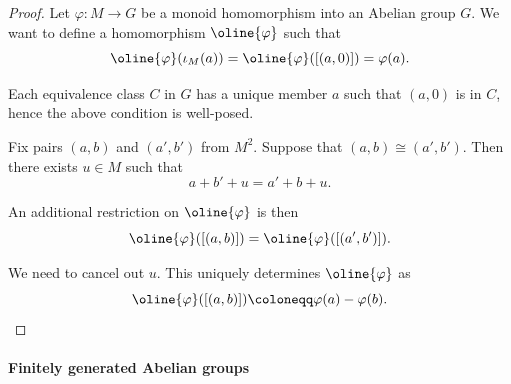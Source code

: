 \begin{proof}
  Let \( \varphi: M \to G \) be a monoid homomorphism into an Abelian group \( G \). We want to define a homomorphism \( \oline{\varphi} \) such that
  \begin{equation*}
    \oline{\varphi}(\iota_M(a)) = \oline{\varphi}([(a, 0)]) = \varphi(a).
  \end{equation*}

  Each equivalence class \( C \) in \( G \) has a unique member \( a \) such that \( (a, 0) \) is in \( C \), hence the above condition is well-posed.

  Fix pairs \( (a, b) \) and \( (a', b') \) from \( M^2 \). Suppose that \( (a, b) \cong (a', b') \). Then there exists \( u \in M \) such that
  \begin{equation*}
    a + b' + u = a' + b + u.
  \end{equation*}

  An additional restriction on \( \oline{\varphi} \) is then
  \begin{equation*}
    \oline{\varphi}([(a, b)])
    =
    \oline{\varphi}([(a', b')]).
  \end{equation*}

  We need to cancel out \( u \). This uniquely determines \( \oline{\varphi} \) as
  \begin{equation*}
    \oline{\varphi}([(a, b)]) \coloneqq \varphi(a) - \varphi(b).
  \end{equation*}
\end{proof}

\paragraph{Finitely generated Abelian groups}

